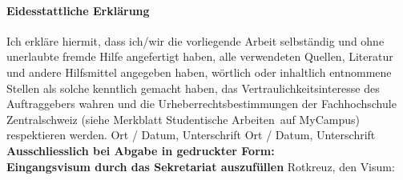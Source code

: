 \paragraph{\textbf{Eidesstattliche Erkl\"arung}}
Ich erkl\"are hiermit, dass ich/wir die vorliegende Arbeit selbst\"andig und ohne unerlaubte fremde Hilfe angefertigt haben, alle verwendeten Quellen, Literatur und andere Hilfsmittel angegeben haben, w\"ortlich oder inhaltlich entnommene Stellen als solche kenntlich gemacht haben, das Vertraulichkeitsinteresse des Auftraggebers wahren und die Urheberrechtsbestimmungen der Fachhochschule Zentralschweiz (siehe Merkblatt \flqq Studentische Arbeiten\frqq\ auf MyCampus) respektieren werden. \newline \newline
Ort / Datum, Unterschrift	\underline{\hspace*{8cm}} \newline \newline
Ort / Datum, Unterschrift	\underline{\hspace*{8cm}} \newline \newline \newline
\textbf{Ausschliesslich bei Abgabe in gedruckter Form: \\
Eingangsvisum durch das Sekretariat auszuf\"ullen}\newline \newline
Rotkreuz, den	\underline{\hspace*{4cm}}	\hspace*{1cm} Visum:	\underline{\hspace*{4cm}}

\newpage